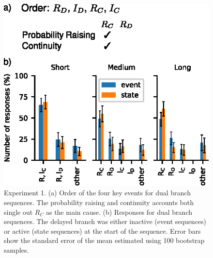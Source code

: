 \documentclass[10pt,letterpaper]{article}
\newcommand{\ev}[2]{$#1_#2$}
\begin{document}

\begin{figure}
\begin{center}
\includegraphics{figures/expt1test.eps}
\end{center}
\caption{Experiment 1. (a) Order of the four key events for dual branch sequences. The probability raising and continuity accounts both single out \ev{R}{C} as the main cause. (b)  Responses for dual branch sequences. The delayed branch was either inactive (event sequences) or active (state sequences) at the start of the sequence. Error bars show the standard error of the mean estimated using 100 bootstrap samples.} 
\label{fig:expt1}
\end{figure}
\end{document}

